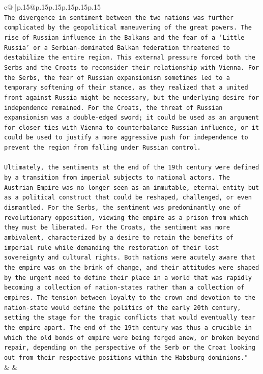 \documentclass{article}
\begin{document}
{\begin{supertabular}{c@{$\;$}|p{.15\linewidth}@{}p{.15\linewidth}p{.15\linewidth}p{.15\linewidth}p{.15\linewidth}p{.15\linewidth}}
{{{\\ 
\texttt{The divergence in sentiment between the two nations was further complicated by the geopolitical maneuvering of the great powers. The rise of Russian influence in the Balkans and the fear of a 'Little Russia' or a Serbian{-}dominated Balkan federation threatened to destabilize the entire region. This external pressure forced both the Serbs and the Croats to reconsider their relationship with Vienna. For the Serbs, the fear of Russian expansionism sometimes led to a temporary softening of their stance, as they realized that a united front against Russia might be necessary, but the underlying desire for independence remained. For the Croats, the threat of Russian expansionism was a double{-}edged sword; it could be used as an argument for closer ties with Vienna to counterbalance Russian influence, or it could be used to justify a more aggressive push for independence to prevent the region from falling under Russian control.} \\
\\ 
\texttt{Ultimately, the sentiments at the end of the 19th century were defined by a transition from imperial subjects to national actors. The Austrian Empire was no longer seen as an immutable, eternal entity but as a political construct that could be reshaped, challenged, or even dismantled. For the Serbs, the sentiment was predominantly one of revolutionary opposition, viewing the empire as a prison from which they must be liberated. For the Croats, the sentiment was more ambivalent, characterized by a desire to retain the benefits of imperial rule while demanding the restoration of their lost sovereignty and cultural rights. Both nations were acutely aware that the empire was on the brink of change, and their attitudes were shaped by the urgent need to define their place in a world that was rapidly becoming a collection of nation{-}states rather than a collection of empires. The tension between loyalty to the crown and devotion to the nation{-}state would define the politics of the early 20th century, setting the stage for the tragic conflicts that would eventually tear the empire apart. The end of the 19th century was thus a crucible in which the old bonds of empire were being forged anew, or broken beyond repair, depending on the perspective of the Serb or the Croat looking out from their respective positions within the Habsburg dominions."} \\
            }
        }
    }
    & & \\ \\


\end{supertabular}}
\end{document}
